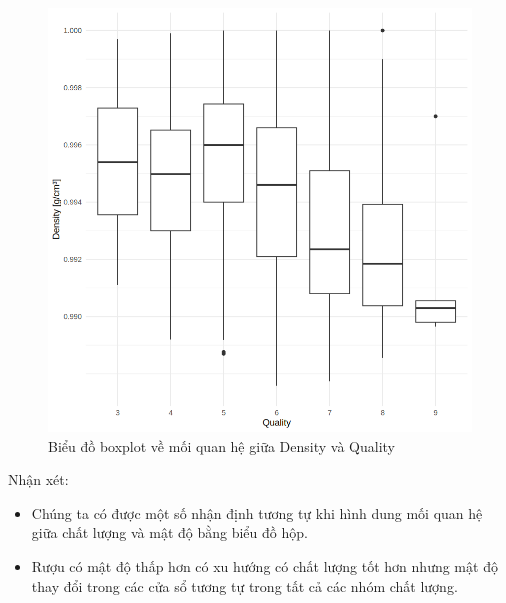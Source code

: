 \begin{figure}[H]
    \centering
    \includegraphics[width=0.75\columnwidth]{wine_colors/wine_density_quality_boxplot.png}
    \caption{Biểu đồ boxplot về mối quan hệ giữa Density và Quality}
    \label{fig:wine_density_quality_boxplot}
\end{figure}
Nhận xét:
\begin{itemize}
    \item Chúng ta có được một số nhận định tương tự khi hình dung mối quan hệ giữa chất lượng và mật độ bằng biểu đồ hộp. 
    \item Rượu có mật độ thấp hơn có xu hướng có chất lượng tốt hơn nhưng mật độ thay đổi trong các cửa sổ tương tự trong tất cả các nhóm chất lượng.
\end{itemize}

